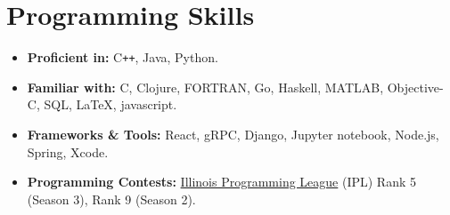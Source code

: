 \documentclass[11pt,a4paper,sans]{moderncv}        %
\begin{document}
\vspace{-5pt}
\section{Programming Skills}
\vspace{-5pt}
\begin{itemize}
	\item \textbf{Proficient in:}
	      C\texttt{++}, 
	      Java,
	      Python.
	\item \textbf{Familiar with:}
		  C,
	      Clojure,
	      FORTRAN,
	      Go,
	      Haskell,
	      MATLAB,
		  Objective-C,
	      SQL,
	      \LaTeX,
	      javascript.
	\item \textbf{Frameworks \& Tools:}
	      React,
	      gRPC,
	      Django,
	      Jupyter notebook,
	      Node.js, 
		  Spring,
		  Xcode.
	\item \textbf{Programming Contests:}
	      \href{https://icpc.cs.illinois.edu/halloffame.html}{Illinois Programming League} (IPL) Rank 5 (Season 3), Rank 9 (Season 2).
\end{itemize}

% 
% 
\end{document}
